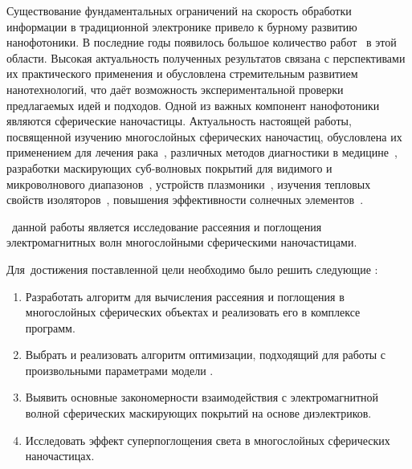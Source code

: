 {\actuality} Существование фундаментальных ограничений на скорость
обработки информации в традиционной электронике привело к бурному
развитию нанофотоники. В последние годы появилось большое количество
работ~\cite{Tame-quantum-plasmonics-2013,
  Javier-graphene-plasmonics-2014, Khurgin-loss-plasmonics-2015,
  He-tunable-terahertz-graphene-metamaterials-2015,
  Segal-meta-nonlinar-PhC-2015,
  Poddubny-hyperbolic-metamaterials-2013, Kildishev-metasurface-2013}
в этой области.  Высокая актуальность полученных результатов связана с
перспективами их практического применения и обусловлена стремительным
развитием нанотехнологий, что даёт возможность экспериментальной
проверки предлагаемых идей и подходов. Одной из важных компонент
нанофотоники являются сферические наночастицы.  Актуальность настоящей
работы, посвященной изучению многослойных сферических наночастиц,
обусловлена их применением для лечения рака~\cite{Zhang-2010,
  Hirsch-2003}, различных методов диагностики в
медицине~\cite{Allain-2002}, разработки маскирующих суб-волновых
покрытий для видимого и микроволнового диапазонов~\cite{Qui-2009,
  Semouchkina-2013}, устройств плазмоники~\cite{Martin-2013,
  Alu-2005}, изучения тепловых свойств изоляторов~\cite{Xie-2013},
повышения эффективности солнечных элементов~\cite{Kameya-2011,
  Mann-2011}.


\aim\ данной работы является %
исследование рассеяния и поглощения электромагнитных волн многослойными
сферическими наночастицами.

Для~достижения поставленной цели необходимо было решить следующие {\tasks}:
\begin{enumerate}
  \item Разработать алгоритм для вычисления рассеяния и поглощения в
    многослойных сферических объектах и реализовать его в комплексе программ.
  \item Выбрать и реализовать алгоритм оптимизации, подходящий для
    работы с произвольными параметрами модели%
    .
  \item Выявить основные закономерности взаимодействия с
    электромагнитной волной сферических маскирующих покрытий на
    основе диэлектриков.
  \item Исследовать эффект суперпоглощения света в многослойных
    сферических наночастицах.
\end{enumerate}

